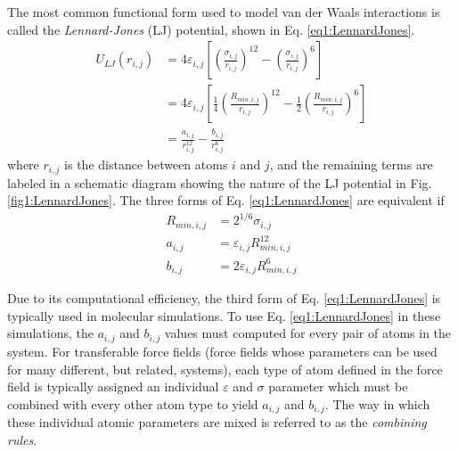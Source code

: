 The most common functional form used to model van der Waals interactions is
called the \emph{Lennard-Jones} (LJ) potential, shown in Eq.
\ref{eq1:LennardJones}.
\begin{align}
   U_{LJ} (r_{i,j}) & = 4 \varepsilon_{i,j} \left [ \left ( \frac {\sigma_{i,j}}
      {r_{i,j}} \right ) ^ {12} - \left ( \frac {\sigma_{i,j}} {r_{i,j}} 
      \right ) ^ 6 \right ] \nonumber \\
                    & = 4 \varepsilon_{i,j} \left [ \frac 1 4 \left ( \frac
      {R_{min,i,j}} {r_{i,j}} \right ) ^ {12} - \frac 1 2 \left (
      \frac{R_{min,i,j}} {r_{i,j}} \right ) ^ 6 \right ]
      \label{eq1:LennardJones} \\
                    & = \frac {a_{i,j}} {r_{i,j} ^ {12}} - \frac {b_{i,j}}
      {r_{i,j} ^ 6} \nonumber
\end{align}
where $r_{i,j}$ is the distance between atoms $i$ and $j$, and the remaining
terms are labeled in a schematic diagram showing the nature of the LJ potential
in Fig. \ref{fig1:LennardJones}. The three forms of Eq. \ref{eq1:LennardJones}
are equivalent if
\begin{eqnarray*}
   R_{min,i,j} & = 2 ^ {1/6} \sigma _ {i,j} \\
   a_{i,j} & = \varepsilon _ {i,j} R_{min,i,j} ^ {12} \\
   b_{i,j} & = 2 \varepsilon _ {i,j} R_{min,i,j} ^ 6
\end{eqnarray*}

Due to its computational efficiency, the third form of Eq.
\ref{eq1:LennardJones} is typically used in molecular simulations. To use Eq.
\ref{eq1:LennardJones} in these simulations, the $a_{i,j}$ and $b_{i,j}$ values
must computed for every pair of atoms in the system. For transferable force
fields (\ie force fields whose parameters can be used for many different, but
related, systems), each type of atom defined in the force field is typically
assigned an individual $\varepsilon$ and $\sigma$ parameter which must be
combined with every other atom type to yield $a_{i,j}$ and $b_{i,j}$. The way in
which these individual atomic parameters are mixed is referred to as the
\emph{combining rules}.

